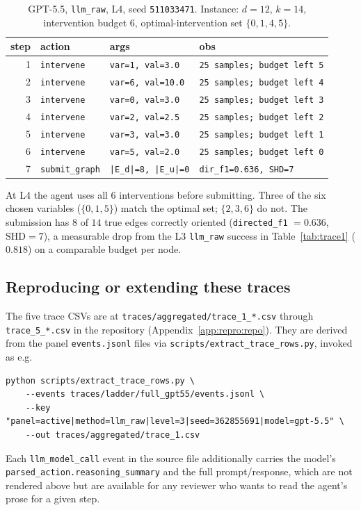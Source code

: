 \begin{table}[h]
\centering
\small
\begin{tabular}{@{}r l l l@{}}
\toprule
step & action & args & obs \\
\midrule
1 & \texttt{intervene}    & \texttt{var=1, val=3.0}    & \texttt{25 samples; budget left 5} \\
2 & \texttt{intervene}    & \texttt{var=6, val=10.0}   & \texttt{25 samples; budget left 4} \\
3 & \texttt{intervene}    & \texttt{var=0, val=3.0}    & \texttt{25 samples; budget left 3} \\
4 & \texttt{intervene}    & \texttt{var=2, val=2.5}    & \texttt{25 samples; budget left 2} \\
5 & \texttt{intervene}    & \texttt{var=3, val=3.0}    & \texttt{25 samples; budget left 1} \\
6 & \texttt{intervene}    & \texttt{var=5, val=2.0}    & \texttt{25 samples; budget left 0} \\
7 & \texttt{submit\_graph} & \texttt{|E\_d|=8, |E\_u|=0} & \texttt{dir\_f1=0.636, SHD=7} \\
\bottomrule
\end{tabular}
\caption{GPT-5.5, \texttt{llm\_raw}, L4, seed \texttt{511033471}. Instance: $d = 12$, $k = 14$, intervention budget $6$, optimal-intervention set $\{0, 1, 4, 5\}$.}
\label{tab:trace5}
\end{table}

At L4 the agent uses all $6$ interventions before submitting. Three of the six chosen variables ($\{0, 1, 5\}$) match the optimal set; $\{2, 3, 6\}$ do not. The submission has $8$ of $14$ true edges correctly oriented (\texttt{directed\_f1} $= 0.636$, $\mathrm{SHD} = 7$), a measurable drop from the L3 \texttt{llm\_raw} success in Table~\ref{tab:trace1} ($0.818$) on a comparable budget per node.

\subsection{Reproducing or extending these traces}
\label{app:traces:reproduce}

The five trace CSVs are at \texttt{traces/aggregated/trace\_1\_*.csv} through \texttt{trace\_5\_*.csv} in the repository (Appendix~\ref{app:repro:repo}). They are derived from the panel \texttt{events.jsonl} files via \texttt{scripts/extract\_trace\_rows.py}, invoked as e.g.\
\begin{verbatim}
python scripts/extract_trace_rows.py \
    --events traces/ladder/full_gpt55/events.jsonl \
    --key "panel=active|method=llm_raw|level=3|seed=362855691|model=gpt-5.5" \
    --out traces/aggregated/trace_1.csv
\end{verbatim}
Each \texttt{llm\_model\_call} event in the source file additionally carries the model's \texttt{parsed\_action.reasoning\_summary} and the full prompt/response, which are not rendered above but are available for any reviewer who wants to read the agent's prose for a given step.
